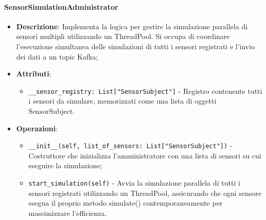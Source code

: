 \documentclass[10pt]{article}
\begin{document}
    \paragraph{SensorSimulationAdministrator}
    \begin{itemize} 
    \item \textbf{Descrizione}: Implementa la logica per gestire la simulazione parallela di sensori multipli utilizzando un ThreadPool. Si occupa di coordinare l'esecuzione simultanea delle simulazioni di tutti i sensori registrati e l'invio dei dati a un topic Kafka;
    \item \textbf{Attributi}:
    \begin{itemize}
        \item \texttt{\_\_sensor\_registry: List["SensorSubject"]} - Registro contenente tutti i sensori da simulare, memorizzati come una lista di oggetti SensorSubject.
    \end{itemize}
    
    \item \textbf{Operazioni}:
    \begin{itemize}
        \item \texttt{\_\_init\_\_(self, list\_of\_sensors: List["SensorSubject"])} - Costruttore che inizializza l'amministratore con una lista di sensori su cui eseguire la simulazione;
        
        \item \texttt{start\_simulation(self)} - Avvia la simulazione parallela di tutti i sensori registrati utilizzando un ThreadPool, assicurando che ogni sensore esegua il proprio metodo simulate() contemporaneamente per massimizzare l'efficienza.
    \end{itemize}
    \end{itemize}
\end{document}
